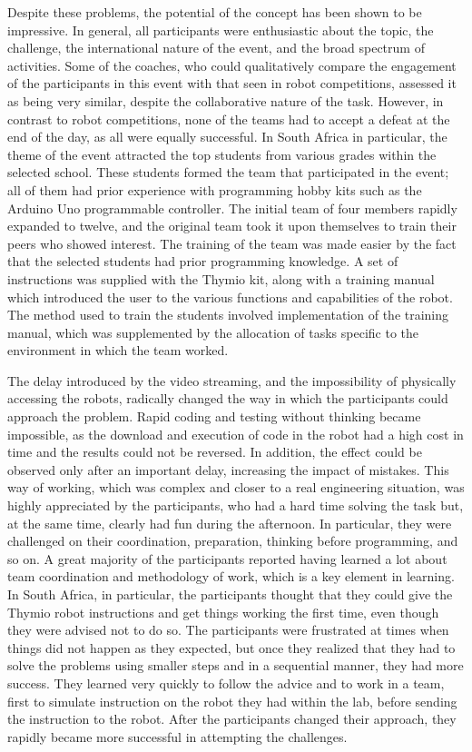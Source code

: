 \documentclass{intech-journal}
\begin{document}
Despite these problems, the potential of the concept has been shown to be impressive.
In general, all participants were enthusiastic about the topic, the challenge, the international nature of the event, and the broad spectrum of activities. 
Some of the coaches, who could qualitatively compare the engagement of the participants in this event with that seen in robot competitions, assessed it as being very similar, despite the collaborative nature of the task. 
However, in contrast to robot competitions, none of the teams had to accept a defeat at the end of the day, as all were equally successful. 
In South Africa in particular, the theme of the event attracted the top students from various grades within the selected school. 
These students formed the team that participated in the event; all of them had prior experience with programming hobby kits such as the Arduino Uno programmable controller. 
The initial team of four members rapidly expanded to twelve, and the original team took it upon themselves to train their peers who showed interest. 
The training of the team was made easier by the fact that the selected students had prior programming knowledge. 
A set of instructions was supplied with the Thymio kit, along with a training manual which introduced the user to the various functions and capabilities of the robot. 
The method used to train the students involved implementation of the training manual, which was supplemented by the allocation of tasks specific to the environment in which the team worked. 

The delay introduced by the video streaming, and the impossibility of physically accessing the robots, radically changed the way in which the participants could approach the problem.
Rapid coding and testing without thinking became impossible, as the download and execution of code in the robot had a high cost in time and the results could not be reversed. 
In addition, the effect could be observed only after an important delay, increasing the impact of mistakes.
This way of working, which was complex and closer to a real engineering situation, was highly appreciated by the participants, who had a hard time solving the task but, at the same time, clearly had fun during the afternoon.
In particular, they were challenged on their coordination, preparation, thinking before programming, and so on. 
A great majority of the participants reported having learned a lot about team coordination and methodology of work, which is a key element in learning.
In South Africa, in particular, the participants thought that they could give the Thymio robot instructions and get things working the first time, even though they were advised not to do so. 
The participants were frustrated at times when things did not happen as they expected, but once they realized that they had to solve the problems using smaller steps and in a sequential manner, they had more success. 
They learned very quickly to follow the advice and to work in a team, first to simulate instruction on the robot they had within the lab, before sending the instruction to the robot.
After the participants changed their approach, they rapidly became more successful in attempting the challenges. 
\end{document}
